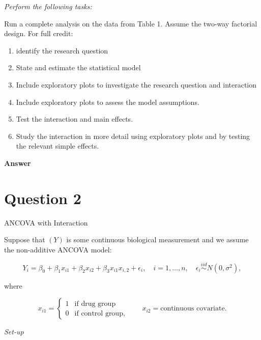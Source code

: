 \documentclass[letterpaper]{article}
\begin{document}
	\textit{Perform the following tasks:}
	
	Run a complete analysis on the data from Table 1. Assume the two-way factorial design. For full credit:
	
	\begin{enumerate}
		
		\item identify the research question
		\item State and estimate the statistical model
		\item Include exploratory plots to investigate the research question and interaction
		\item Include exploratory plots to assess the model assumptions.
		\item Test the interaction and main effects.
		\item Study the interaction in more detail using exploratory plots and by testing the relevant simple effects.
	\end{enumerate}
	
	\textbf{Answer}
	
	
	
	
	\clearpage
	
	\section{Question 2}
	
	{\color{deepred}  ANCOVA with Interaction}
	
	Suppose that $(Y)$ is some continuous biological measurement and we assume the non-additive ANCOVA model:
	
	\begin{equation}
		Y_i = \beta_0 + \beta_1 x_{i1} + \beta_2 x_{i2} + \beta_3 x_{i1} x_{i,2} + \epsilon_i, \quad i = 1, \ldots, n, \quad \epsilon_i \overset{iid}{\sim} N(0, \sigma^2),
	\end{equation}
	
	where
	
	\[
	x_{i1} = \begin{cases} 1 & \text{if drug group} \\ 0 & \text{if control group,} \end{cases} \qquad x_{i2} = \text{continuous covariate.}
	\]
	
	\textit{Set-up}
	
\end{document}
